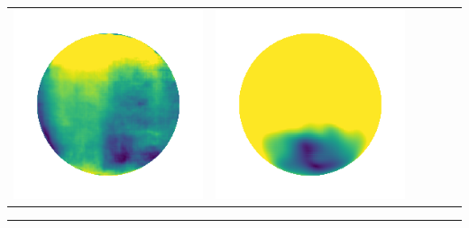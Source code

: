 \begin{center}
\begin{tabularx}{\linewidth}{@{}Y@{}Y@{}Y@{}Y@{}Y@{}Y@{}}
\includegraphics[width=\linewidth]{semisynthetic/20160617_13_marrnet_err.png} &
\includegraphics[width=\linewidth]{semisynthetic/20160617_13_ef_err.png} \\
\end{tabularx}
\begin{center}\rule{0.5\linewidth}{\linethickness}\end{center}


\end{center}
